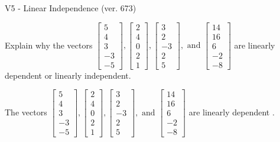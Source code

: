 \begin{exercise}
  \begin{exerciseTitle}V5 - Linear Independence (ver. 673)\end{exerciseTitle}
  \begin{exerciseStatement}
    Explain why the vectors \(\left[\begin{array}{r}
5 \\
4 \\
3 \\
-3 \\
-5
\end{array}\right] , \left[\begin{array}{r}
2 \\
4 \\
0 \\
2 \\
1
\end{array}\right] , \left[\begin{array}{r}
3 \\
2 \\
-3 \\
2 \\
5
\end{array}\right] , \text{ and } \left[\begin{array}{r}
14 \\
16 \\
6 \\
-2 \\
-8
\end{array}\right]\) are linearly dependent or linearly independent.	


  \end{exerciseStatement}
  \begin{exerciseAnswer}
   The vectors \(\left[\begin{array}{r}
5 \\
4 \\
3 \\
-3 \\
-5
\end{array}\right] , \left[\begin{array}{r}
2 \\
4 \\
0 \\
2 \\
1
\end{array}\right] , \left[\begin{array}{r}
3 \\
2 \\
-3 \\
2 \\
5
\end{array}\right] , \text{ and } \left[\begin{array}{r}
14 \\
16 \\
6 \\
-2 \\
-8
\end{array}\right]\) are 
  	 linearly dependent  .
  


  \end{exerciseAnswer}
\end{exercise}